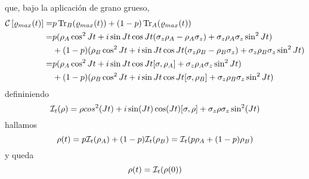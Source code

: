 que, bajo la aplicación de grano grueso,
\begin{align*}
    \mathcal{C}\left[\varrho_{max}(t)\right]=&p\Tr_{B}(\varrho_{max}(t))+(1-p)\Tr_{A}(\varrho_{max}(t))\\
    =&p(\rho_{A}\cos^{2}{Jt}+i\sin{Jt}\cos{Jt}(\sigma_{z}\rho_{A}- \rho_{A}\sigma_{z})+\sigma_{z}\rho_{A}\sigma_{z}\sin^{2}{Jt})\\
    &+(1-p)(\rho_{B}\cos^{2}{Jt}+i\sin{Jt}\cos{Jt}(\sigma_{z}\rho_{B}- \rho_{B}\sigma_{z})+\sigma_{z}\rho_{B}\sigma_{z}\sin^{2}{Jt})\\
    =&p(\rho_{A}\cos^{2}{Jt}+i\sin{Jt}\cos{Jt}[\sigma,\rho_{A}]+\sigma_{z}\rho_{A}\sigma_{z}\sin^{2}{Jt})\\
    &+(1-p)(\rho_{B}\cos^{2}{Jt}+i\sin{Jt}\cos{Jt}[\sigma,\rho_{B}]+\sigma_{z}\rho_{B}\sigma_{z}\sin^{2}{Jt})\\
\end{align*}
defininiendo
\begin{equation}
    \mathcal{I}_{t}(\rho)=\rho cos^{2}(Jt)+i\sin(Jt)\cos(Jt)[\sigma,\rho]+\sigma_{z}\rho\sigma_{z}\sin^{2}(Jt)
\end{equation}
hallamos
\begin{equation}
    \rho(t)=p\mathcal{I}_{t}(\rho_{A})+(1-p)\mathcal{I}_{t}(\rho_{B})=\mathcal{I}_{t}(p\rho_{A}+(1-p)\rho_{B})
\end{equation}
y queda
\begin{equation}
    \rho(t)=\mathcal{I}_{t}(\rho(0))
\end{equation}

